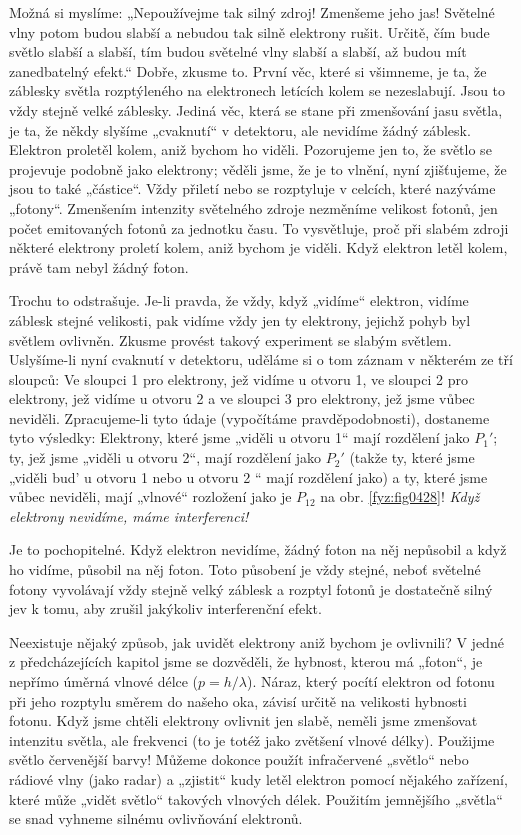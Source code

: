     Možná si myslíme: „Nepoužívejme tak silný zdroj! Zmenšeme jeho jas! Světelné vlny potom budou
    slabší a nebudou tak silně elektrony rušit. Určitě, čím bude světlo slabší a slabší, tím budou
    světelné vlny slabší a slabší, až budou mít zanedbatelný efekt.“ Dobře, zkusme to. První věc,
    které si všimneme, je ta, že záblesky světla rozptýleného na elektronech letících kolem se
    nezeslabují. Jsou to vždy stejně velké záblesky. Jediná věc, která se stane při zmenšování jasu
    světla, je ta, že někdy slyšíme „cvaknutí“ v detektoru, ale nevidíme žádný záblesk. Elektron
    proletěl kolem, aniž bychom ho viděli. Pozorujeme jen to, že světlo se projevuje podobně jako
    elektrony; věděli jsme, že je to vlnění, nyní zjišťujeme, že jsou to také „částice“. Vždy
    přiletí nebo se rozptyluje v celcích, které nazýváme „fotony“. Zmenšením intenzity světelného
    zdroje nezměníme velikost fotonů, jen počet emitovaných fotonů za jednotku času. To vysvětluje,
    proč při slabém zdroji některé elektrony proletí kolem, aniž bychom je viděli. Když elektron
    letěl kolem, právě tam nebyl žádný foton.

    Trochu to odstrašuje. Je-li pravda, že vždy, když „vidíme“ elektron, vidíme záblesk stejné
    velikosti, pak vidíme vždy jen ty elektrony, jejichž pohyb byl světlem ovlivněn. Zkusme provést
    takový experiment se slabým světlem. Uslyšíme-li nyní cvaknutí v detektoru, uděláme si o tom
    záznam v některém ze tří sloupců: Ve sloupci 1 pro elektrony, jež vidíme u otvoru 1, ve sloupci
    2 pro elektrony, jež vidíme u otvoru 2 a ve sloupci 3 pro elektrony, jež jsme vůbec neviděli.
    Zpracujeme-li tyto údaje (vypočítáme pravděpodobnosti), dostaneme tyto výsledky: Elektrony,
    které jsme „viděli u otvoru 1“ mají rozdělení jako \(P_1'\); ty, jež jsme „viděli u otvoru 2“,
    mají rozdělení jako \(P_2'\) (takže ty, které jsme „viděli bud' u otvoru 1 nebo u otvoru 2 “
    mají rozdělení jako) a ty, které jsme vůbec neviděli, mají „vlnové“ rozložení jako je \(P_{12}\)
    na obr. \ref{fyz:fig0428}! \emph{Když elektrony nevidíme, máme interferenci!}
    
    Je to pochopitelné. Když elektron nevidíme, žádný foton na něj nepůsobil a když ho vidíme,
    působil na něj foton. Toto působení je vždy stejné, neboť světelné fotony vyvolávají vždy stejně
    velký záblesk a rozptyl fotonů je dostatečně silný jev k tomu, aby zrušil jakýkoliv
    interferenční efekt.
    
    Neexistuje nějaký způsob, jak uvidět elektrony aniž bychom je ovlivnili? V jedné z
    předcházejících kapitol jsme se dozvěděli, že hybnost, kterou má „foton“, je nepřímo úměrná
    vlnové délce (\(p= h/\lambda\)). Náraz, který pocítí elektron od fotonu při jeho rozptylu směrem
    do našeho oka, závisí určitě na velikosti hybnosti fotonu. Když jsme chtěli elektrony ovlivnit
    jen slabě, neměli jsme zmenšovat intenzitu světla, ale frekvenci (to je totéž jako zvětšení
    vlnové délky). Použijme světlo červenější barvy! Můžeme dokonce použít infračervené „světlo“
    nebo rádiové vlny (jako radar) a „zjistit“ kudy letěl elektron pomocí nějakého zařízení, které
    může „vidět světlo“ takových vlnových délek. Použitím jemnějšího „světla“ se snad vyhneme
    silnému ovlivňování elektronů.
    
